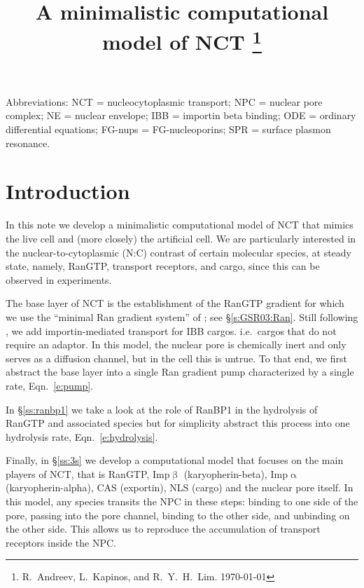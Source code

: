 \documentclass[12pt,notitlepage]{article}
\title{%
A minimalistic computational model of NCT%
\thanks{%
R.~Andreev, L.~Kapinos, and R.~Y.~H.~Lim.
\today
\hfill
\tiny\color{lightgray}\hfill{\DTMnow}
}}
\date{}
\begin{document}
\maketitle


{
\small
Abbreviations:
NCT = nucleocytoplasmic transport;
NPC = nuclear pore complex;
NE = nuclear envelope;
IBB = importin beta binding; 
ODE = ordinary differential equations;
FG-nups = FG-nucleoporins;
SPR = surface plasmon resonance.
}

\section{Introduction}


%

In this note we develop a minimalistic computational
model of 
NCT
that mimics
the live cell and (more closely) the artificial cell.
%
%
We are particularly
interested in 
the nuclear-to-cytoplasmic (N:C) contrast
of 
certain molecular species,
at steady state,
namely,
RanGTP,
transport receptors,
and
cargo,
since this can be observed in experiments.

%

The base layer of NCT is the establishment of 
the RanGTP gradient
for which we use the ``minimal Ran gradient system''
of \cite{GoerlichSeewaldRibbeck2003};
see \S\ref{s:GSR03:Ran}.
%
%
Still following \cite{GoerlichSeewaldRibbeck2003},
we add importin-mediated transport 
for IBB cargos.
%
i.e.~cargos that do not require an adaptor.
%
%
%
In this model,
the nuclear pore is chemically inert 
and only serves as a diffusion channel,
but in the cell this is untrue.
%
To that end,
we first abstract
the base layer into a single
Ran gradient pump characterized
by a single rate, Eqn.~\ref{e:pump}. 

%

In \S\ref{ss:ranbp1} we take a look at the role
of RanBP1
in the hydrolysis of RanGTP
and associated species
but
for simplicity
abstract this process into 
one hydrolysis rate, Eqn.~\eqref{e:hydrolysis}.

%

Finally, in \S\ref{ss:3s}
we develop 
a computational model
that focuses
on the main players of NCT,
that is
{RanGTP},
{Imp$\upbeta$} (karyopherin-beta),
{Imp$\upalpha$} (karyopherin-alpha),
{CAS} (exportin),
{NLS} (cargo)
and
the nuclear pore itself.
%
%
%
In this model,
any species transits the NPC
in these steps:
binding to one side of the pore,
passing into the pore channel,
binding to the other side,
and unbinding on the other side.
%
%
This allows us
to reproduce the accumulation
of transport receptors
inside the NPC.
\end{document}
